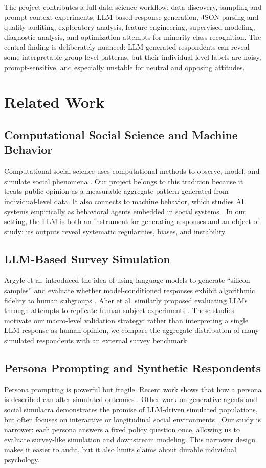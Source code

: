 ﻿\documentclass[sigconf,nonacm]{acmart}
\begin{document}
The project contributes a full data-science workflow: data discovery, sampling and prompt-context experiments, LLM-based response generation, JSON parsing and quality auditing, exploratory analysis, feature engineering, supervised modeling, diagnostic analysis, and optimization attempts for minority-class recognition. The central finding is deliberately nuanced: LLM-generated respondents can reveal some interpretable group-level patterns, but their individual-level labels are noisy, prompt-sensitive, and especially unstable for neutral and opposing attitudes.

\section{Related Work}
\subsection{Computational Social Science and Machine Behavior}
Computational social science uses computational methods to observe, model, and simulate social phenomena \cite{lazer2009computational}. Our project belongs to this tradition because it treats public opinion as a measurable aggregate pattern generated from individual-level data. It also connects to machine behavior, which studies AI systems empirically as behavioral agents embedded in social systems \cite{rahwan2019machine}. In our setting, the LLM is both an instrument for generating responses and an object of study: its outputs reveal systematic regularities, biases, and instability.

\subsection{LLM-Based Survey Simulation}
Argyle et al. introduced the idea of using language models to generate ``silicon samples'' and evaluate whether model-conditioned responses exhibit algorithmic fidelity to human subgroups \cite{argyle2023out}. Aher et al. similarly proposed evaluating LLMs through attempts to replicate human-subject experiments \cite{aher2023using}. These studies motivate our macro-level validation strategy: rather than interpreting a single LLM response as human opinion, we compare the aggregate distribution of many simulated respondents with an external survey benchmark.

\subsection{Persona Prompting and Synthetic Respondents}
Persona prompting is powerful but fragile. Recent work shows that how a persona is described can alter simulated outcomes \cite{lutz2025prompt}. Other work on generative agents and social simulacra demonstrates the promise of LLM-driven simulated populations, but often focuses on interactive or longitudinal social environments \cite{park2022social,park2023generative}. Our study is narrower: each persona answers a fixed policy question once, allowing us to evaluate survey-like simulation and downstream modeling. This narrower design makes it easier to audit, but it also limits claims about durable individual psychology.
\end{document}
